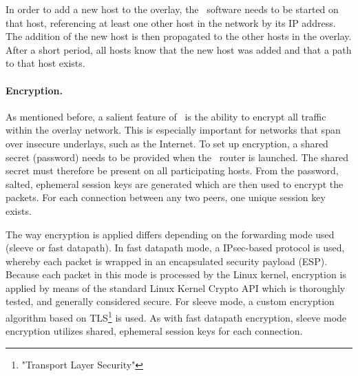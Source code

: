 In order to add a new host to the overlay, the \weave\ software needs to be started on that host, referencing at least one other host in the network by its IP address. The addition of the new host is then propagated to the other hosts in the overlay. After a short period, all hosts know that the new host was added and that a path to that host exists.

\paragraph{Encryption.} 
As mentioned before, a salient feature of \wnet\ is the ability to encrypt all traffic within the overlay network. This is especially important for networks that span over insecure underlays, such as the Internet. To set up encryption, a shared secret (password) needs to be provided when the \weave\ router is launched. The shared secret must therefore be present on all participating hosts. From the password, salted, ephemeral session keys are generated which are then used to encrypt the packets. For each connection between any two peers, one unique session key exists.

The way encryption is applied differs depending on the forwarding mode used (sleeve or fast datapath). In fast datapath mode, a IPsec-based protocol is used, whereby each packet is wrapped in an encapsulated security payload (ESP). Because each packet in this mode is processed by the Linux kernel, encryption is applied by means of the standard Linux Kernel Crypto API which is thoroughly tested, and generally considered secure. For sleeve mode, a custom encryption algorithm based on TLS\footnote{"Transport Layer Security"} is used. As with fast datapath encryption, sleeve mode encryption utilizes shared, ephemeral session keys for each connection.

